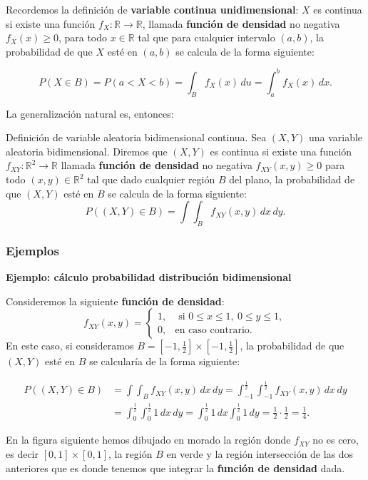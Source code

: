 \documentclass[
  letterpaper,
  DIV=11,
  numbers=noendperiod]{scrreprt}
\begin{document}
Recordemos la definición de \textbf{variable continua unidimensional}:
\(X\) es continua si existe una función
\(f_X:\mathbb{R}\longrightarrow \mathbb{R}\), llamada \textbf{función de
densidad} no negativa \(f_X(x)\geq 0\), para todo \(x\in\mathbb{R}\) tal
que para cualquier intervalo \((a,b)\), la probabilidad de que \(X\)
esté en \((a,b)\) se calcula de la forma siguiente:

\[
P(X\in B)=P(a< X < b)=\int_B f_{X}(x)\,du=\int_a^b f_{X}(x)\,dx.
\]

La generalización natural es, entonces:

Definición de variable aleatoria bidimensional continua. Sea \((X,Y)\)
una variable aleatoria bidimensional. Diremos que \((X,Y)\) es continua
si existe una función \(f_{XY}:\mathbb{R}^2\longrightarrow \mathbb{R}\)
llamada \textbf{función de densidad} no negativa \(f_{XY}(x,y)\geq 0\)
para todo \((x,y)\in\mathbb{R}^2\) tal que dado cualquier región \(B\)
del plano, la probabilidad de que \((X,Y)\) esté en \(B\) se calcula de
la forma siguiente: \[
P((X,Y)\in B)=\int\int_B f_{XY}(x,y)\,dx\,dy.
\]

\hypertarget{ejemplos}{%
\subsubsection{Ejemplos}\label{ejemplos}}

\textbf{Ejemplo: cálculo probabilidad distribución bidimensional}

Consideremos la siguiente \textbf{función de densidad}: \[
f_{XY}(x,y)=\begin{cases}
1, & \mbox{ si }0\leq x\leq 1,\ 0\leq y\leq 1, \\
0, & \mbox{en caso contrario.}
\end{cases}
\] En este caso, si consideramos
\(B=\left[-1,\frac{1}{2}\right]\times \left[-1,\frac{1}{2}\right]\), la
probabilidad de que \((X,Y)\) esté en \(B\) se calcularía de la forma
siguiente:

\[
\begin{array}{rl}
P((X,Y)\in B)&=\int\int_{B} f_{XY}(x,y)\, dx\, dy=\int_{-1}^{\frac{1}{2}}\int_{-1}^{\frac{1}{2}} f_{XY}(x,y)\, dx\, dy \\
&=\int_0^{\frac{1}{2}}\int_0^{\frac{1}{2}} 1\, dx\,dy=\int_0^{\frac{1}{2}} 1\, dx\int_0^{\frac{1}{2}} 1\, dy=\frac{1}{2}\cdot\frac{1}{2}=\frac{1}{4}.
\end{array}
\]

En la figura siguiente hemos dibujado en morado la región donde
\(f_{XY}\) no es cero, es decir \([0,1]\times [0,1]\), la región \(B\)
en verde y la región intersección de las dos anteriores que es donde
tenemos que integrar la \textbf{función de densidad} dada.
\end{document}
